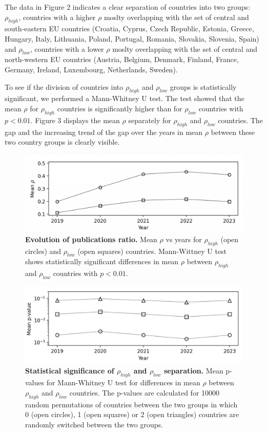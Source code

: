 \documentclass[amsfonts, amssymb, prl, superscriptaddress, notitlepage, twocolumn, nofootinbib]{revtex4-2}
\begin{document}
The data in Figure 2 indicates a clear separation of countries into two groups: $\rho_{high}$, countries with a higher $\rho$ moslty overlapping with the set of central and south-eastern EU countries (Croatia, Cyprus, Czech Republic, Estonia, Greece, Hungary, Italy, Lithuania, Poland, Portugal, Romania, Slovakia, Slovenia, Spain) and $\rho_{low}$, countries with a lower $\rho$ moslty overlapping with the set of central and north-western EU countries (Austria, Belgium, Denmark, Finland, France, Germany, Ireland, Luxembourg, Netherlands, Sweden). 

To see if the division of countries into $\rho_{high}$ and $\rho_{low}$ groups is statistically significant, we performed a Mann-Whitney U test. The test showed that the mean $\rho$ for $\rho_{high}$ countries is significantly higher than for $\rho_{low}$ countries with $p<0.01$. Figure 3 displays the mean $\rho$ separately for $\rho_{high}$ and $\rho_{low}$ countries. The gap and the increasing trend of the gap over the years in mean $\rho$ between these two country groups is clearly visible. 

\begin{figure}
    \centering
    \includegraphics[width=1.0\linewidth]{Fig02f.png}
    \caption{\label{fig:fig3} {\bf Evolution of publications ratio.} Mean $\rho$ vs years for $\rho_{high}$ (open circles) and $\rho_{low}$ (open squares) countries. Mann-Wittney U test shows statistically significant  differences in mean $\rho$ between $\rho_{high}$ and $\rho_{low}$ countries with $p<0.01$.
    }
\end{figure}

\begin{figure}
    \centering
    \includegraphics[width=1.0\linewidth]{Fig02af.png}
    \caption{\label{fig:fig4} {\bf Statistical significance of $\rho_{high}$ and $\rho_{low}$ separation.} Mean p-values for Mann-Whitney U test for differences in mean $\rho$ between $\rho_{high}$ and $\rho_{low}$ countries. The p-values are calculated for 10000 random permutations of countries between the two groups in which 0 (open circles), 1 (open squares) or 2 (open triangles) countries are randomly switched between the two groups.
    }
\end{figure}
\end{document}
